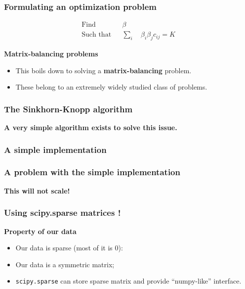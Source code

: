 \documentclass[xcolor=dvipsnames]{beamer}
\begin{document}
\begin{frame}
\frametitle{Formulating an optimization problem}
\begin{equation*}
\renewcommand{\arraystretch}{2}
\begin{array}{ccll}
\text{Find} & & \beta \\
\text{Such that} & & \underset{i}{\sum} \quad \beta_i \beta_j c_{ij} = K
\end{array}
\end{equation*}

\vspace{1em}
{\bf \color{Blue} Matrix-balancing problems} \\
\begin{itemize}[label={$\bullet$}]
\item This boils down to solving a {\bf matrix-balancing} problem.
\item These belong to an extremely widely studied class of problems.
\end{itemize}
\end{frame}

\begin{frame}
\frametitle{The Sinkhorn-Knopp algorithm}
{\bf \color{Blue} A very simple algorithm exists to solve this issue.}

\end{frame}

\begin{frame}
\frametitle{A simple implementation}

\end{frame}

\begin{frame}
\frametitle{A problem with the simple implementation}
\begin{center}
\begin{centering}
{\bf \color{Red} \Large This will not scale!}
\end{centering}
\end{center}
\end{frame}

\begin{frame}
\frametitle{Using scipy.sparse matrices !}
{\bf \color{Blue} Property of our data}
\begin{itemize}[label={$\bullet$}]
\item Our data is sparse (most of it is 0):
\item Our data is a symmetric matrix;
\item \texttt{scipy.sparse} can store sparse matrix and provide ``numpy-like'' interface.
\end{itemize}

\begin{columns}
\begin{column}{0.5\linewidth}
\end{column}
\begin{column}{0.5\linewidth}

\end{column}
\end{columns}
\end{frame}
\end{document}
